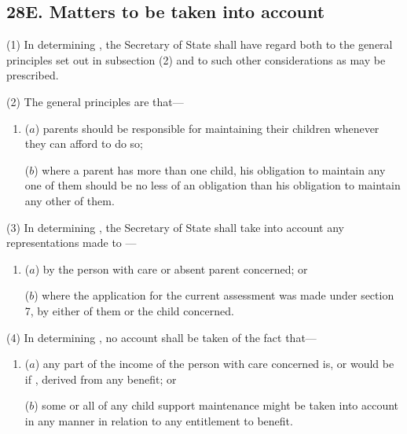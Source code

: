 \documentclass[12pt,a4paper]{article}
\begin{document}
\subsection{28E. Matters to be taken into account}

(1) In determining , the Secretary of State shall have regard both to the general principles set out in subsection (2) and to such other considerations as may be prescribed.

(2) The general principles are that---
\begin{enumerate}\item[]
($a$) parents should be responsible for maintaining their children whenever they can afford to do so;

($b$) where a parent has more than one child, his obligation to maintain any one of them should be no less of an obligation than his obligation to maintain any other of them.
\end{enumerate}

(3) In determining , the Secretary of State shall take into account any representations made to —
\begin{enumerate}\item[]
($a$) by the person with care or absent parent concerned; or

($b$) where the application for the current assessment was made under section 7, by either of them or the child concerned.
\end{enumerate}

(4) In determining , no account shall be taken of the fact that—
\begin{enumerate}\item[]
($a$) any part of the income of the person with care concerned is, or would be if , derived from any benefit; or

($b$) some or all of any child support maintenance might be taken into account in any manner in relation to any entitlement to benefit.
\end{enumerate}
\end{document}
